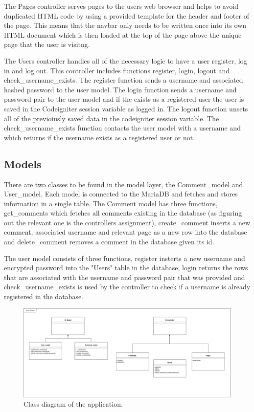 \documentclass[a4paper]{scrartcl}
\begin{document}
The Pages controller serves pages to the users web browser and helps to avoid duplicated HTML code by using a provided template for the header and footer of the page. This means that the navbar only needs to be written once into its own HTML document which is then loaded at the top of the page above the unique page that the user is visitng. 

The Users controller handles all of the necessary logic to have a user register, log in and log out. This controller includes functions register, login, logout and check\_username\_exists.
The register function sends a username and associated hashed password to the user model. The login function sends a username and password pair to the user model and if the exists as a registered user the user is saved in the Codeigniter session variable as logged in.
The logout function unsets all of the previoiusly saved data in the codeigniter session variable.
The check\_username\_exists function contacts the user model with a username and which returns if the username exists as a registered user or not.

\subsection{Models}
There are two classes to be found in the model layer, the Comment\_model and User\_model. Each model is connected to the MariaDB and fetches and stores information in a single table. The Comment model has three functions, get\_comments which fetches all comments existing in the database (as figuring out the relevant one is the controllers assignment), create\_comment inserts a new comment, associated username and relevant page as a new row into the database and delete\_comment removes a comment in the database given its id.

The user model consists of three functions, register insterts a new username and encrypted password into the "Users" table in the database, login returns the rows that are associated with the username and password pair that was provided and check\_username\_exists is used by the controller to check if a username is already registered in the database.

\begin{figure}[h!]
  \begin{center}
    \includegraphics[scale=0.25]{images/class_diagram.png}
    \caption{Class diagram of the application.}
    \label{fig:class_diagram}
  \end{center}
\end{figure}
\end{document}
